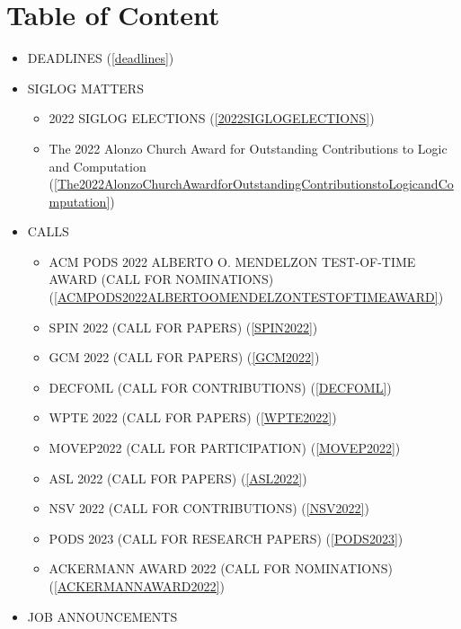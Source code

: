 \documentclass[prodmode,acmtecs]{acmsmall} %
\begin{document}
\section{Table of Content}\begin{itemize}\item DEADLINES (\cref{deadlines}) 
 
\item SIGLOG MATTERS 
 
\begin{itemize}\item 2022 SIGLOG ELECTIONS (\cref{2022SIGLOGELECTIONS})
\item The 2022 Alonzo Church Award for Outstanding Contributions to Logic and Computation (\cref{The2022AlonzoChurchAwardforOutstandingContributionstoLogicandComputation})
\end{itemize} 
\item CALLS 
 
\begin{itemize}\item ACM PODS 2022 ALBERTO O. MENDELZON TEST-OF-TIME AWARD (CALL FOR NOMINATIONS) (\cref{ACMPODS2022ALBERTOOMENDELZONTESTOFTIMEAWARD})
\item SPIN 2022 (CALL FOR PAPERS) (\cref{SPIN2022})
\item GCM 2022 (CALL FOR PAPERS) (\cref{GCM2022})
\item DECFOML (CALL FOR CONTRIBUTIONS) (\cref{DECFOML})
\item WPTE 2022 (CALL FOR PAPERS) (\cref{WPTE2022})
\item MOVEP2022 (CALL FOR PARTICIPATION) (\cref{MOVEP2022})
\item ASL 2022 (CALL FOR PAPERS) (\cref{ASL2022})
\item NSV 2022 (CALL FOR CONTRIBUTIONS) (\cref{NSV2022})
\item PODS 2023 (CALL FOR RESEARCH PAPERS) (\cref{PODS2023})
\item ACKERMANN AWARD 2022 (CALL FOR NOMINATIONS) (\cref{ACKERMANNAWARD2022})
\end{itemize} 
\item JOB ANNOUNCEMENTS 
 

\end{itemize}
\end{document}
